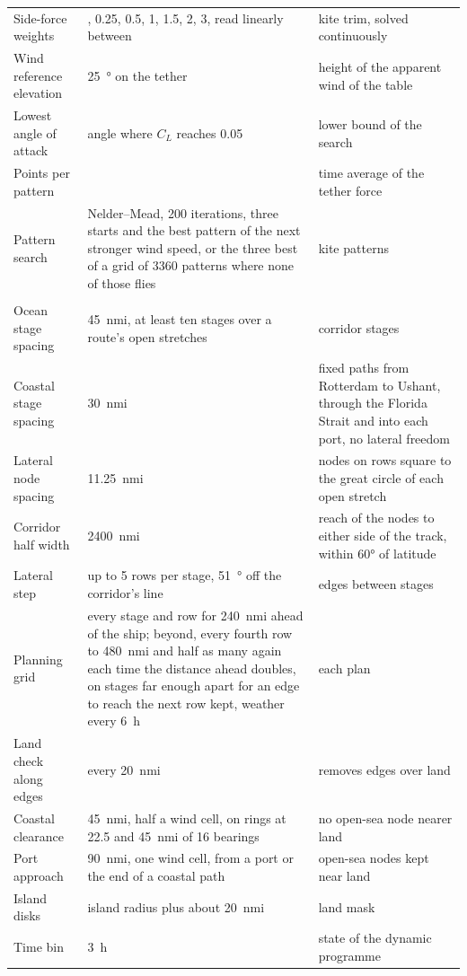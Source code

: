 {\begin{longtable}{@{}>{\raggedright\arraybackslash}p{4.2cm}>{\raggedright\arraybackslash}p{4.8cm}>{\raggedright\arraybackslash}p{6.6cm}@{}}
Side-force weights & 0, 0.25, 0.5, 1, 1.5, 2, 3, read linearly between & kite trim, solved continuously \\
Wind reference elevation & \SI{25}{\degree} on the tether & height of the apparent wind of the table \\
Lowest angle of attack & angle where $C_L$ reaches 0.05 & lower bound of the search \\
Points per pattern & 48 & time average of the tether force \\
Pattern search & Nelder--Mead, 200 iterations, three starts and the best pattern of the next stronger wind speed, or the three best of a grid of \num{3360} patterns where none of those flies & kite patterns \\
\multicolumn{3}{@{}l}{\textit{Corridors and routing}}\\
Ocean stage spacing & \SI{45}{nmi}, at least ten stages over a route's open stretches & corridor stages \\
Coastal stage spacing & \SI{30}{nmi} & fixed paths from Rotterdam to Ushant, through the Florida Strait and into each port, no lateral freedom \\
Lateral node spacing & \SI{11.25}{nmi} & nodes on rows square to the great circle of each open stretch \\
Corridor half width & \SI{2400}{nmi} & reach of the nodes to either side of the track, within \ang{60} of latitude \\
Lateral step & up to 5 rows per stage, \SI{51}{\degree} off the corridor's line & edges between stages \\
Planning grid & every stage and row for \SI{240}{nmi} ahead of the ship; beyond, every fourth row to \SI{480}{nmi} and half as many again each time the distance ahead doubles, on stages far enough apart for an edge to reach the next row kept, weather every \SI{6}{h} & each plan \\
Land check along edges & every \SI{20}{nmi} & removes edges over land \\
Coastal clearance & \SI{45}{nmi}, half a wind cell, on rings at 22.5 and \SI{45}{nmi} of 16 bearings & no open-sea node nearer land \\
Port approach & \SI{90}{nmi}, one wind cell, from a port or the end of a coastal path & open-sea nodes kept near land \\
Island disks & island radius plus about \SI{20}{nmi} & land mask \\
Time bin & \SI{3}{h} & state of the dynamic programme \\

\end{longtable}}
